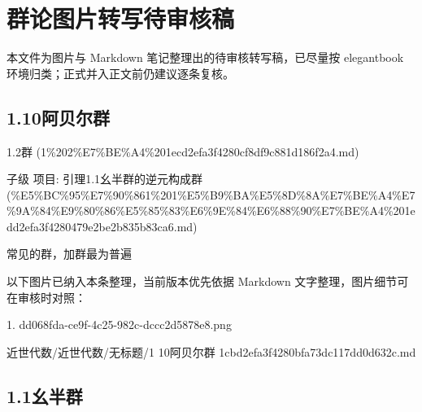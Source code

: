 \chapter{群论图片转写待审核稿}

\begin{dxtips}

本文件为图片与 Markdown 笔记整理出的待审核转写稿，已尽量按 elegantbook 环境归类；正式并入正文前仍建议逐条复核。

\end{dxtips}

\section*{1.10阿贝尔群}

\begin{note}[来源上级主题]

1.2群 (1\%202\%E7\%BE\%A4\%201ecd2efa3f4280cf8df9c881d186f2a4.md)

\end{note}

\begin{note}[1.10阿贝尔群]

子级 项目: 引理1.1幺半群的逆元构成群 (\%E5\%BC\%95\%E7\%90\%861\%201\%E5\%B9\%BA\%E5\%8D\%8A\%E7\%BE\%A4\%E7\%9A\%84\%E9\%80\%86\%E5\%85\%83\%E6\%9E\%84\%E6\%88\%90\%E7\%BE\%A4\%201edd2efa3f4280479e2be2b835b83ca6.md)

常见的群，加群最为普遍

\end{note}

\begin{note}[关联图片]
以下图片已纳入本条整理，当前版本优先依据 Markdown 文字整理，图片细节可在审核时对照：

1. dd068fda-ce9f-4c25-982c-dccc2d5878e8.png\\

\end{note}

\begin{note}[来源路径]

近世代数/近世代数/无标题/1 10阿贝尔群 1cbd2efa3f4280bfa73dc117dd0d632c.md

\end{note}

\section*{1.1幺半群}


